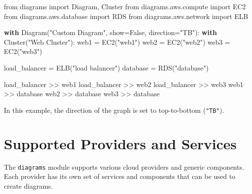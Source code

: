 \documentclass[
  letterpaper,
  DIV=11,
  numbers=noendperiod]{scrreprt}
\newenvironment{Shaded}{\begin{snugshade}}{\end{snugshade}}
\newcommand{\ControlFlowTok}[1]{\textcolor[rgb]{0.00,0.23,0.31}{\textbf{#1}}}
\newcommand{\ImportTok}[1]{\textcolor[rgb]{0.00,0.46,0.62}{#1}}
\newcommand{\NormalTok}[1]{\textcolor[rgb]{0.00,0.23,0.31}{#1}}
\newcommand{\OperatorTok}[1]{\textcolor[rgb]{0.37,0.37,0.37}{#1}}
\newcommand{\StringTok}[1]{\textcolor[rgb]{0.13,0.47,0.30}{#1}}
\newcommand{\VariableTok}[1]{\textcolor[rgb]{0.07,0.07,0.07}{#1}}
\begin{document}
\begin{Shaded}
\begin{Highlighting}[]
\ImportTok{from}\NormalTok{ diagrams }\ImportTok{import}\NormalTok{ Diagram, Cluster}
\ImportTok{from}\NormalTok{ diagrams.aws.compute }\ImportTok{import}\NormalTok{ EC2}
\ImportTok{from}\NormalTok{ diagrams.aws.database }\ImportTok{import}\NormalTok{ RDS}
\ImportTok{from}\NormalTok{ diagrams.aws.network }\ImportTok{import}\NormalTok{ ELB}

\ControlFlowTok{with}\NormalTok{ Diagram(}\StringTok{"Custom Diagram"}\NormalTok{, show}\OperatorTok{=}\VariableTok{False}\NormalTok{, direction}\OperatorTok{=}\StringTok{"TB"}\NormalTok{):}
    \ControlFlowTok{with}\NormalTok{ Cluster(}\StringTok{"Web Cluster"}\NormalTok{):}
\NormalTok{        web1 }\OperatorTok{=}\NormalTok{ EC2(}\StringTok{"web1"}\NormalTok{)}
\NormalTok{        web2 }\OperatorTok{=}\NormalTok{ EC2(}\StringTok{"web2"}\NormalTok{)}
\NormalTok{        web3 }\OperatorTok{=}\NormalTok{ EC2(}\StringTok{"web3"}\NormalTok{)}
        
\NormalTok{    load\_balancer }\OperatorTok{=}\NormalTok{ ELB(}\StringTok{"load balancer"}\NormalTok{)}
\NormalTok{    database }\OperatorTok{=}\NormalTok{ RDS(}\StringTok{"database"}\NormalTok{)}

\NormalTok{    load\_balancer }\OperatorTok{\textgreater{}\textgreater{}}\NormalTok{ web1}
\NormalTok{    load\_balancer }\OperatorTok{\textgreater{}\textgreater{}}\NormalTok{ web2}
\NormalTok{    load\_balancer }\OperatorTok{\textgreater{}\textgreater{}}\NormalTok{ web3}
\NormalTok{    web1 }\OperatorTok{\textgreater{}\textgreater{}}\NormalTok{ database}
\NormalTok{    web2 }\OperatorTok{\textgreater{}\textgreater{}}\NormalTok{ database}
\NormalTok{    web3 }\OperatorTok{\textgreater{}\textgreater{}}\NormalTok{ database}
\end{Highlighting}
\end{Shaded}

In this example, the direction of the graph is set to top-to-bottom
(\texttt{"TB"}).

\section{Supported Providers and
Services}\label{supported-providers-and-services}

The \texttt{diagrams} module supports various cloud providers and
generic components. Each provider has its own set of services and
components that can be used to create diagrams.
\end{document}
